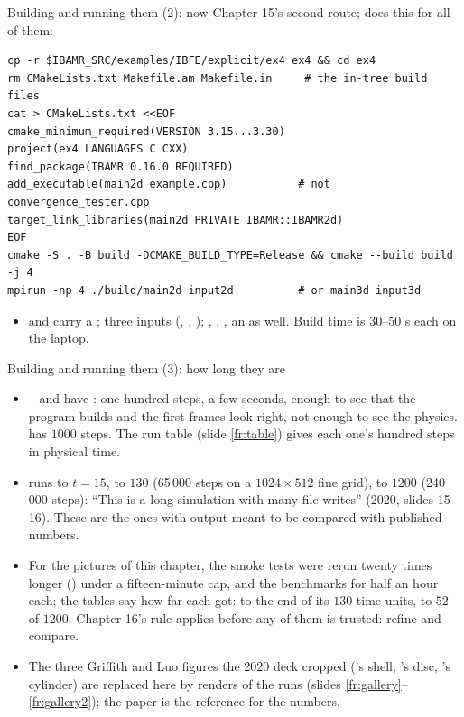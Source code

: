 \documentclass[aspectratio=169,11pt]{beamer}
\begin{document}
\begin{frame}[fragile]{Building and running them (2): now}
\label{fr:build}
\footnotesize
Chapter 15's second route;  does this for all of them:
\begin{lstlisting}[style=shell]
cp -r $IBAMR_SRC/examples/IBFE/explicit/ex4 ex4 && cd ex4
rm CMakeLists.txt Makefile.am Makefile.in     # the in-tree build files
cat > CMakeLists.txt <<EOF
cmake_minimum_required(VERSION 3.15...3.30)
project(ex4 LANGUAGES C CXX)
find_package(IBAMR 0.16.0 REQUIRED)
add_executable(main2d example.cpp)           # not convergence_tester.cpp
target_link_libraries(main2d PRIVATE IBAMR::IBAMR2d)
EOF
cmake -S . -B build -DCMAKE_BUILD_TYPE=Release && cmake --build build -j 4
mpirun -np 4 ./build/main2d input2d          # or main3d input3d
\end{lstlisting}
\begin{itemize}
  \item {} and  carry a ;  three inputs (, , ); , , ,  an  as well. Build time is $30$--$50$ s each on the laptop.
\end{itemize}
\end{frame}

\begin{frame}{Building and running them (3): how long they are}
\label{fr:length}
\footnotesize
\begin{itemize}
  \item {} -- and  have : one hundred steps, a few seconds, enough to see that the program builds and the first frames look right, not enough to see the physics.  has $1000$ steps. The run table (slide \ref{fr:table}) gives each one's hundred steps in physical time.
  \item {}  runs to $t = 15$,  to $130$ (65\,000 steps on a $1024\times512$ fine grid),  to $1200$ (240\,000 steps): ``This is a long simulation with many file writes'' (2020, slides 15--16). These are the ones with  output meant to be compared with published numbers.
  \item For the pictures of this chapter, the smoke tests were rerun twenty times longer () under a fifteen-minute cap, and the benchmarks for half an hour each; the tables say how far each got:  to the end of its $130$ time units,  to $52$ of $1200$. Chapter 16's rule applies before any of them is trusted: refine and compare.
  \item The three Griffith and Luo figures the 2020 deck cropped ('s shell, 's disc, 's cylinder) are replaced here by renders of the runs (slides \ref{fr:gallery}--\ref{fr:gallery2}); the paper is the reference for the numbers.
\end{itemize}
\end{frame}
\end{document}
